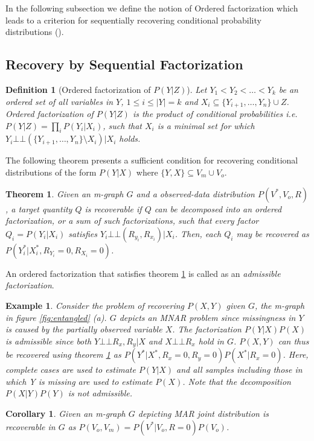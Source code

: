 \documentclass[12pt]{article}
\newcommand{\compos}{\mbox{$\bot\!\!\!\bot$}}
\newtheorem{example}{Example}
\newtheorem{definition}{Definition}
\newtheorem{thm}{Theorem}
\newtheorem{cor}{Corollary}
\begin{document}
In the following subsection we define the notion of Ordered
factorization which leads to a criterion for sequentially
recovering conditional probability distributions (\cite{mohan2013,mohan2014_missing}).

\subsection{Recovery by Sequential Factorization}

\begin{definition}[Ordered factorization of $P(Y|Z)$] 
	Let $Y_1<Y_2 < \ldots < Y_k$ be an ordered set of all variables in $Y$, $1 \le i\le |Y|=k$ and $X_i \subseteq \{Y_{i+1}, \ldots, Y_n\}\cup Z$. 	
	 Ordered factorization of $P(Y|Z)$  is the product of conditional probabilities i.e. $P(Y|Z) =\prod_i P(Y_i|X_i)$, 
	 such that $X_i$ is a minimal set for which  $Y_i\compos (\{Y_{i+1}, \ldots, Y_n\}\setminus X_i)|X_i$ holds.
\end{definition}
The following theorem presents a sufficient condition for recovering conditional distributions of the form $P(Y|X)$ where $\{Y,X\}\subseteq V_m\cup V_o$.
\begin{thm} %
	Given an m-graph $G$ and a observed-data distribution $P(V^*,V_o,R)$, a target quantity $Q$ is recoverable if $Q$ can be decomposed into
	an ordered factorization, or a sum of such factorizations,
	such that every factor $Q_i=P(Y_i | X_i)$ satisfies
	$Y_i \compos (R_{y_i}, R_{x_i}) | X_i$. 	Then, each $Q_i$ may be recovered as $P(Y^*_i|X^*_i,R_{Y_i}=0,R_{X_i}=0)$.
	\label{thm:seq}
\end{thm}
An ordered factorization that satisfies theorem \ref{thm:seq} is called as an \textit{admissible factorization}.
\begin{example}
Consider the problem of recovering $P(X,Y)$ given $G$, the m-graph in figure \ref{fig:entangled} (a). $G$ depicts an MNAR problem since missingness in $Y$ is caused by the partially observed variable $X$. The factorization $P(Y|X)P(X)$ is admissible  since both $Y \compos R_x,R_y|X$ and  $X \compos R_x$ hold in $G$. 
$P(X,Y)$ can thus be recovered using theorem \ref{thm:seq} as $P(Y^*|X^*,R_x=0,R_y=0)P(X^*|R_x=0)$.  Here, complete cases are used to estimate $P(Y|X)$
and all samples including those in which Y is missing are used to estimate $P(X)$.
Note that the decomposition $P(X|Y)P(Y)$ is not
admissible.
\end{example}

\begin{cor} Given an m-graph $G$ depicting MAR  joint distribution is recoverable in $G$ as $P(V_o,V_m)=P(V^*|V_o,R=0)P(V_o)$. 
	\label{cor:mar}
\end{cor}
 
\end{document}
